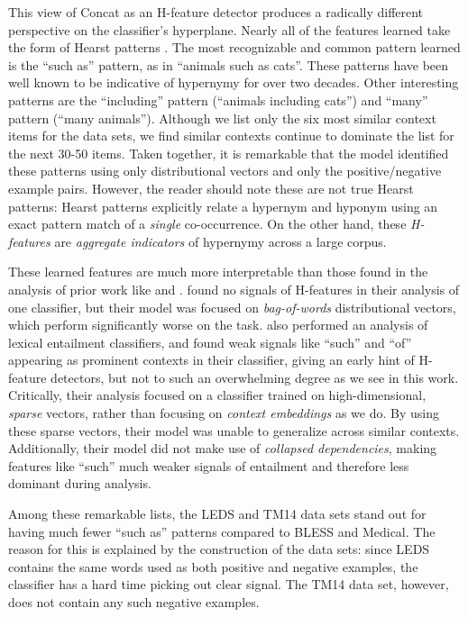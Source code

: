 This view of Concat as an H-feature detector produces a radically different perspective on
the classifier's hyperplane. Nearly all of the features learned take the form of
Hearst patterns \cite{hearst:1992:coling,snow:2004:nips}.
The most recognizable
and common pattern learned is the ``such as'' pattern, as in ``animals such as
cats''.  These patterns have been well known to be indicative of hypernymy
for over two decades. Other interesting patterns are the ``including'' pattern
(``animals including cats'') and ``many'' pattern (``many animals''). Although
we list only the six most similar context items for the data sets, we find
similar contexts continue to dominate the list for the next
30-50 items. Taken together, it is remarkable that the model identified these
patterns using only distributional vectors and only the positive/negative
example pairs. However, the reader should note these are not true Hearst
patterns: Hearst patterns explicitly relate a hypernym and hyponym using an
exact pattern match of a {\em single} co-occurrence. On the other hand, these
{\em H-features} are {\em aggregate indicators} of hypernymy across a large
corpus.

These learned features are much more interpretable than those found in the
analysis of prior work like  and
.  found no signals of
H-features in their analysis of one classifier, but their model was focused
on {\em bag-of-words} distributional vectors, which perform significantly worse
on the task.
 also performed an analysis of lexical entailment
classifiers, and found weak signals like ``such'' and ``of'' appearing as
prominent contexts in their classifier, giving an early hint of H-feature
detectors, but not to such an overwhelming degree as we see in this work.
Critically, their analysis focused on a classifier trained on high-dimensional,
{\em sparse} vectors, rather than focusing on {\em context embeddings} as we
do.  By using these sparse vectors, their model was unable to generalize across
similar contexts. Additionally, their model did not make use of
{\em collapsed dependencies}, making features like ``such'' much weaker signals
of entailment and therefore less dominant during analysis.

Among these remarkable lists, the LEDS and TM14 data sets stand out for having
much fewer ``such as'' patterns compared to BLESS and Medical. The reason
for this is explained by the construction of the data sets: since LEDS
contains the same words used as both positive and negative examples, the
classifier has a hard time picking out clear signal. The TM14 data set, however,
does not contain any such negative examples.

